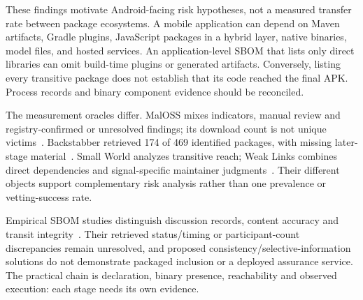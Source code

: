 These findings motivate Android-facing risk hypotheses, not a measured transfer rate between package ecosystems. A mobile application can depend on Maven artifacts, Gradle plugins, JavaScript packages in a hybrid layer, native binaries, model files, and hosted services. An application-level SBOM that lists only direct libraries can omit build-time plugins or generated artifacts. Conversely, listing every transitive package does not establish that its code reached the final APK. Process records and binary component evidence should be reconciled.

The measurement oracles differ. MalOSS mixes indicators, manual review and registry-confirmed or unresolved findings; its download count is not unique victims~\cite{duanpackages}. Backstabber retrieved 174 of 469 identified packages, with missing later-stage material~\cite{backstabber}. Small World analyzes transitive reach; Weak Links combines direct dependencies and signal-specific maintainer judgments~\cite{npmworld,weaklinks}. Their different objects support complementary risk analysis rather than one prevalence or vetting-success rate.

Empirical SBOM studies distinguish discussion records, content accuracy and transit integrity~\cite{bi2024sbom,bomsaway2024}. Their retrieved status/timing or participant-count discrepancies remain unresolved, and proposed consistency/selective-information solutions do not demonstrate packaged inclusion or a deployed assurance service. The practical chain is declaration, binary presence, reachability and observed execution: each stage needs its own evidence.

